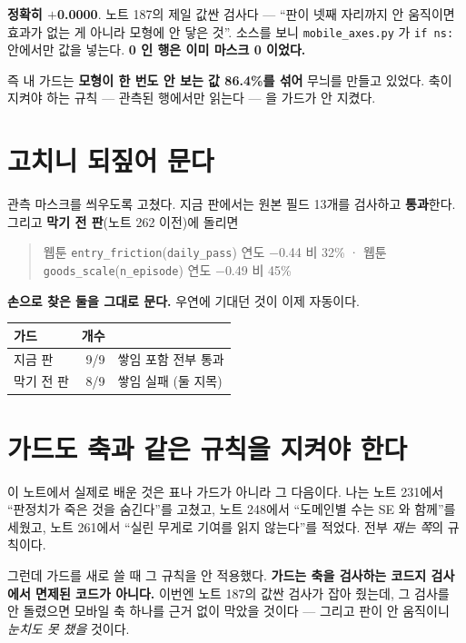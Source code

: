 \documentclass[10pt]{article}
\begin{document}
\textbf{정확히 $+$0.0000}. 노트 187의 제일 값싼 검사다 --- ``판이 넷째 자리까지
안 움직이면 효과가 없는 게 아니라 모형에 안 닿은 것''. 소스를 보니
\texttt{mobile\_axes.py} 가 \texttt{if ns:} 안에서만 값을 넣는다. \textbf{0 인
행은 이미 마스크 0 이었다.}

즉 내 가드는 \textbf{모형이 한 번도 안 보는 값 86.4\%를 섞어} 무늬를 만들고
있었다. 축이 지켜야 하는 규칙 --- 관측된 행에서만 읽는다 --- 을 가드가
안 지켰다.

\section{고치니 되짚어 문다}

관측 마스크를 씌우도록 고쳤다. 지금 판에서는 원본 필드 13개를 검사하고
\textbf{통과}한다. 그리고 \textbf{막기 전 판}(노트 262 이전)에 돌리면

\begin{quote}\small
웹툰 \texttt{entry\_friction}(\texttt{daily\_pass}) 연도 $-$0.44 비 32\% ·
웹툰 \texttt{goods\_scale}(\texttt{n\_episode}) 연도 $-$0.49 비 45\%
\end{quote}

\textbf{손으로 찾은 둘을 그대로 문다.} 우연에 기대던 것이 이제 자동이다.

\begin{center}\small
\begin{tabular}{lrl}
\hline
가드 & 개수 & \\
\hline
지금 판 & 9/9 & 쌓임 포함 전부 통과 \\
막기 전 판 & 8/9 & 쌓임 실패 (둘 지목) \\
\hline
\end{tabular}
\end{center}

\section{가드도 축과 같은 규칙을 지켜야 한다}

이 노트에서 실제로 배운 것은 표나 가드가 아니라 그 다음이다. 나는 노트
231에서 ``판정치가 죽은 것을 숨긴다''를 고쳤고, 노트 248에서 ``도메인별 수는
SE 와 함께''를 세웠고, 노트 261에서 ``실린 무게로 기여를 읽지 않는다''를
적었다. 전부 \emph{재는 쪽}의 규칙이다.

그런데 가드를 새로 쓸 때 그 규칙을 안 적용했다. \textbf{가드는 축을 검사하는
코드지 검사에서 면제된 코드가 아니다.} 이번엔 노트 187의 값싼 검사가
잡아 줬는데, 그 검사를 안 돌렸으면 모바일 축 하나를 근거 없이 막았을
것이다 --- 그리고 판이 안 움직이니 \emph{눈치도 못 챘을} 것이다.
\end{document}
